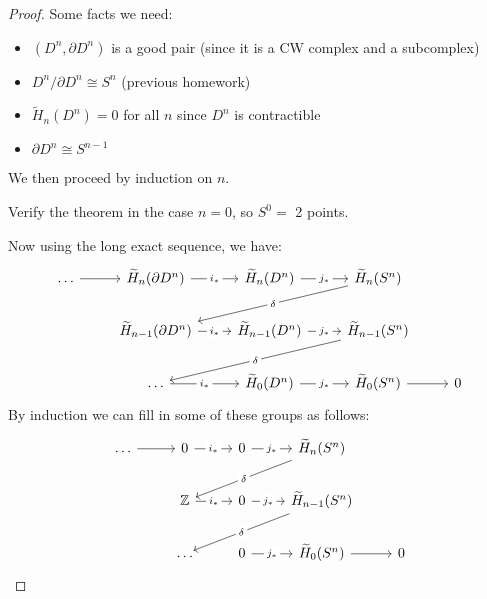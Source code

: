 \begin{proof}
	Some facts we need:
	\begin{itemize}
		\item $(D^n, \partial D^n)$ is a good pair (since it is a CW complex and a subcomplex)
		\item $D^n /\partial D^n \cong S^n$ (previous homework)
		\item $\widetilde{H}_n(D^n) = 0$ for all $n$ since $D^n$ is contractible
		\item $\partial D^n \cong S^{n - 1}$
	\end{itemize}
	We then proceed by induction on $n$.
	\begin{exercise}
		Verify the theorem in the case $n = 0$, so $S^0 = $ 2 points.
	\end{exercise}
	Now using the long exact sequence, we have:
	\[\begin{tikzcd}
			\ldots & {\widetilde{H}_n(\partial D^n)} & {\widetilde{H}_n(D^n)} & {\widetilde{H}_n(S^n)} \\
			& {\widetilde{H}_{n-1}(\partial D^n)} & {\widetilde{H}_{n-1}(D^n)} & {\widetilde{H}_{n-1}(S^n)} \\
			& \ldots & {\widetilde{H}_{0}(D^n)} & {\widetilde{H}_{0}(S^n)} & 0
			\arrow["{j_\ast}"{description}, from=1-3, to=1-4]
			\arrow["{j_\ast}"{description}, from=2-3, to=2-4]
			\arrow[from=3-4, to=3-5]
			\arrow["{i_\ast}"{description}, from=2-2, to=2-3]
			\arrow["{i_\ast}"{description}, from=1-2, to=1-3]
			\arrow[from=1-1, to=1-2]
			\arrow["\delta"{description}, from=1-4, to=2-2]
			\arrow["\delta"{description}, from=2-4, to=3-2]
			\arrow["{j_\ast}"{description}, from=3-3, to=3-4]
			\arrow["{i_\ast}"{description}, from=3-2, to=3-3]
		\end{tikzcd}\]
	By induction we can fill in some of these groups as follows:
	\[\begin{tikzcd}
			\ldots & {0} & {0} & {\widetilde{H}_n(S^n)} \\
			& {\mathbb{\MakeUppercase{z}} } & {0} & {\widetilde{H}_{n-1}(S^n)} \\
			& \ldots & {0} & {\widetilde{H}_{0}(S^n)} & 0
			\arrow["{j_\ast}"{description}, from=1-3, to=1-4]
			\arrow["{j_\ast}"{description}, from=2-3, to=2-4]
			\arrow[from=3-4, to=3-5]
			\arrow["{i_\ast}"{description}, from=2-2, to=2-3]
			\arrow["{i_\ast}"{description}, from=1-2, to=1-3]
			\arrow[from=1-1, to=1-2]
			\arrow["\delta"{description}, from=1-4, to=2-2]
			\arrow["\delta"{description}, from=2-4, to=3-2]
			\arrow["{j_\ast}"{description}, from=3-3, to=3-4]

\end{tikzcd}\]
\end{proof}
